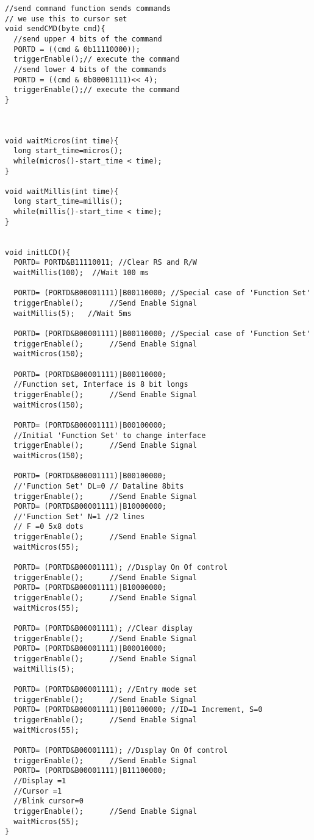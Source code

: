 \documentclass[pdftex,12pt,a4paper]{article}
\begin{document}
\begin{flushleft}
\begin{lstlisting}[language=Arduino]
//send command function sends commands
// we use this to cursor set
void sendCMD(byte cmd){
  //send upper 4 bits of the command
  PORTD = ((cmd & 0b11110000));
  triggerEnable();// execute the command
  //send lower 4 bits of the commands
  PORTD = ((cmd & 0b00001111)<< 4);
  triggerEnable();// execute the command
}



void waitMicros(int time){
  long start_time=micros();
  while(micros()-start_time < time);
}

void waitMillis(int time){
  long start_time=millis();
  while(millis()-start_time < time);
}


void initLCD(){
  PORTD= PORTD&B11110011; //Clear RS and R/W
  waitMillis(100);  //Wait 100 ms
  
  PORTD= (PORTD&B00001111)|B00110000; //Special case of 'Function Set'
  triggerEnable();		//Send Enable Signal
  waitMillis(5);   //Wait 5ms
  
  PORTD= (PORTD&B00001111)|B00110000; //Special case of 'Function Set'
  triggerEnable();		//Send Enable Signal
  waitMicros(150);
  
  PORTD= (PORTD&B00001111)|B00110000;
  //Function set, Interface is 8 bit longs
  triggerEnable();		//Send Enable Signal
  waitMicros(150);
  
  PORTD= (PORTD&B00001111)|B00100000; 
  //Initial 'Function Set' to change interface
  triggerEnable();		//Send Enable Signal
  waitMicros(150);
  
  PORTD= (PORTD&B00001111)|B00100000; 
  //'Function Set' DL=0 // Dataline 8bits
  triggerEnable();		//Send Enable Signal
  PORTD= (PORTD&B00001111)|B10000000; 
  //'Function Set' N=1 //2 lines
  // F =0 5x8 dots
  triggerEnable();		//Send Enable Signal
  waitMicros(55);
  
  PORTD= (PORTD&B00001111); //Dısplay On Of control
  triggerEnable();		//Send Enable Signal
  PORTD= (PORTD&B00001111)|B10000000; 
  triggerEnable();		//Send Enable Signal
  waitMicros(55);
  
  PORTD= (PORTD&B00001111); //Clear display
  triggerEnable();		//Send Enable Signal
  PORTD= (PORTD&B00001111)|B00010000; 
  triggerEnable();		//Send Enable Signal
  waitMillis(5);
  
  PORTD= (PORTD&B00001111); //Entry mode set
  triggerEnable();		//Send Enable Signal
  PORTD= (PORTD&B00001111)|B01100000; //ID=1 Increment, S=0
  triggerEnable();		//Send Enable Signal
  waitMicros(55);
  
  PORTD= (PORTD&B00001111); //Dısplay On Of control
  triggerEnable();		//Send Enable Signal
  PORTD= (PORTD&B00001111)|B11100000; 
  //Display =1
  //Cursor =1
  //Blink cursor=0
  triggerEnable();		//Send Enable Signal
  waitMicros(55);
}


\end{lstlisting}
\end{flushleft}
\end{document}
